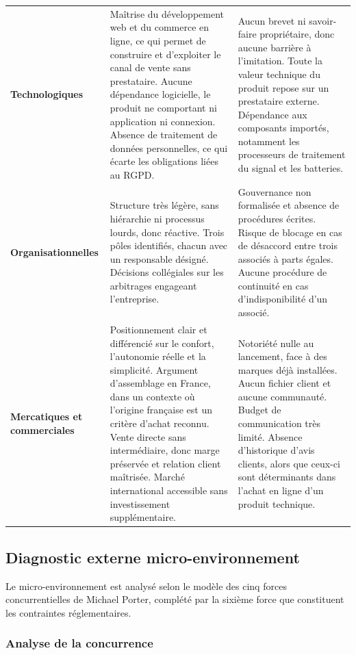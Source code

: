 \begin{center}
\begin{xltabular}{\textwidth}{P{3.2cm}LL}
\textbf{Technologiques}
&
Maîtrise du développement web et du commerce en ligne, ce qui permet de
construire et d'exploiter le canal de vente sans prestataire. Aucune
dépendance logicielle, le produit ne comportant ni application ni connexion.
Absence de traitement de données personnelles, ce qui écarte les obligations
liées au RGPD.
&
Aucun brevet ni savoir-faire propriétaire, donc aucune barrière à l'imitation.
Toute la valeur technique du produit repose sur un prestataire externe.
Dépendance aux composants importés, notamment les processeurs de traitement du
signal et les batteries. \\

\textbf{Organisationnelles}
&
Structure très légère, sans hiérarchie ni processus lourds, donc réactive.
Trois pôles identifiés, chacun avec un responsable désigné. Décisions
collégiales sur les arbitrages engageant l'entreprise.
&
Gouvernance non formalisée et absence de procédures écrites. Risque de blocage
en cas de désaccord entre trois associés à parts égales. Aucune procédure de
continuité en cas d'indisponibilité d'un associé. \\

\textbf{Mercatiques et commerciales}
&
Positionnement clair et différencié sur le confort, l'autonomie réelle et la
simplicité. Argument d'assemblage en France, dans un contexte où l'origine
française est un critère d'achat reconnu. Vente directe sans intermédiaire,
donc marge préservée et relation client maîtrisée. Marché international
accessible sans investissement supplémentaire.
&
Notoriété nulle au lancement, face à des marques déjà installées. Aucun fichier
client et aucune communauté. Budget de communication très limité. Absence
d'historique d'avis clients, alors que ceux-ci sont déterminants dans l'achat
en ligne d'un produit technique. \\
\bottomrule
\end{xltabular}
\end{center}

\clearpage
\subsection{Diagnostic externe \textendash{} micro-environnement}

Le micro-environnement est analysé selon le modèle des cinq forces
concurrentielles de Michael Porter, complété par la sixième force que
constituent les contraintes réglementaires.

\subsubsection{Analyse de la concurrence}

